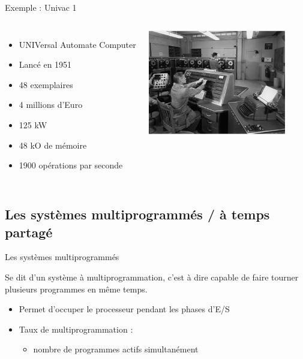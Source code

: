 \begin{frame}{Exemple : Univac 1}
\begin{columns}
\begin{itemize}
\item UNIVersal Automate Computer
\item Lancé en 1951
\item 48 exemplaires
\item 4 millions d'Euro
\item 125 kW
\item 48 kO de mémoire
\item 1900 opérations par seconde
\end{itemize}
	\begin{center}
	\includegraphics[width=6cm]{../illustration/univac.png}
	\end{center}
\end{columns}
\end{frame}



\subsection{Les systèmes multiprogrammés / à temps partagé}
\begin{frame}{Les systèmes multiprogrammés}
\begin{definition}
Se dit d'un système à multiprogrammation, c'est à dire capable de faire tourner plusieurs programmes en même temps.
\end{definition}
\begin{itemize}
\item Permet d'occuper le processeur pendant les phases d'E/S
\item Taux de multiprogrammation : \begin{itemize}
\item nombre de programmes actifs simultanément
\end{itemize}

\end{itemize}
\end{frame}


